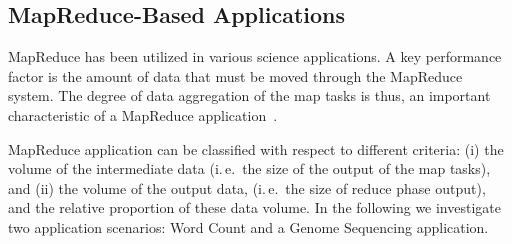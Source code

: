 \documentclass{sig-alternate}
\newcommand{\jhanote}[1]{ {\textcolor{red} { ***SJ: #1 }}}
\newcommand{\alnote}[1]{ {\textcolor{blue} { ***andreL: #1 }}}
\newcommand{\alnote}[1]{}
\newcommand{\jhanote}[1]{}
\newcommand{\upp}{\vspace*{-0.5em}}
\newcommand{\pilotmapreduce}{Pilot-MapReduce\xspace}
\begin{document}
\subsection{MapReduce-Based Applications}

MapReduce has been utilized in various science applications. A key performance 
factor is the amount of data that must be moved through the MapReduce system. 
The degree of data aggregation of the map tasks is thus, an important 
characteristic of a MapReduce application~\cite{weissman-mr-11}.

MapReduce application can be classified with respect to different
criteria: (i) the volume of the intermediate data (i.\,e.\ the size of
the output of the map tasks), and (ii) the volume of the output data,
(i.\,e.\ the size of reduce phase output), and the relative proportion
of these data volume. In the following we investigate two application
scenarios: Word Count and a Genome Sequencing application.


\end{document}
